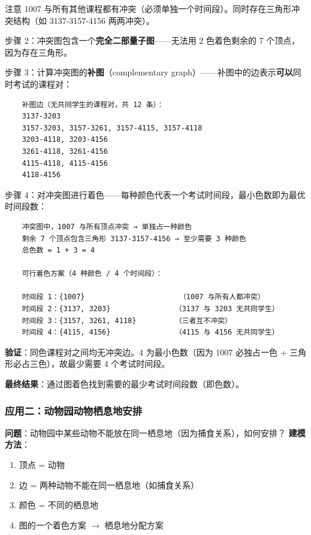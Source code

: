 \documentclass[10pt,a4paper,openany]{ctexbook}
\theoremstyle{definition}
\theoremstyle{remark}
\renewenvironment{quote}
  {\list{}{\leftmargin=1em\rightmargin=0pt\topsep=0.5pt\partopsep=0pt}\item[]}
  {\endlist}
\begin{document}
\begin{quote}
注意 1007 与所有其他课程都有冲突（必须单独一个时间段）。同时存在三角形冲突结构（如 3137-3157-4156 两两冲突）。

步骤 2：冲突图包含一个\textbf{完全二部量子图}——无法用 2 色着色剩余的 7 个顶点，因为存在三角形。

步骤 3：计算冲突图的\textbf{补图}（complementary graph）——补图中的边表示\textbf{可以}同时考试的课程对：

{\footnotesize\begin{verbatim}
    补图边（无共同学生的课程对，共 12 条）：
    3137-3203
    3157-3203, 3157-3261, 3157-4115, 3157-4118
    3203-4118, 3203-4156
    3261-4118, 3261-4156
    4115-4118, 4115-4156
    4118-4156
\end{verbatim}}


步骤 4：对冲突图进行着色——每种颜色代表一个考试时间段，最小色数即为最优时间段数：

{\footnotesize\begin{verbatim}
    冲突图中，1007 与所有顶点冲突 → 单独占一种颜色
    剩余 7 个顶点包含三角形 3137-3157-4156 → 至少需要 3 种颜色
    总色数 = 1 + 3 = 4

    可行着色方案（4 种颜色 / 4 个时间段）：
    
    时间段 1：{1007}                      （1007 与所有人都冲突）
    时间段 2：{3137, 3203}               （3137 与 3203 无共同学生）
    时间段 3：{3157, 3261, 4118}         （三者互不冲突）
    时间段 4：{4115, 4156}               （4115 与 4156 无共同学生）
\end{verbatim}}


\textbf{验证}：同色课程对之间均无冲突边。4 为最小色数（因为 1007 必独占一色 + 三角形必占三色），故最少需要 4 个考试时间段。

\textbf{最终结果}：通过图着色找到需要的最少考试时间段数（即色数）。

\end{quote}

\subsubsection{应用二：动物园动物栖息地安排}

\textbf{问题}：动物园中某些动物不能放在同一栖息地（因为捕食关系），如何安排？
\textbf{建模方法}：
\begin{enumerate}
\item 顶点 = 动物
\item 边 = 两种动物不能在同一栖息地（如捕食关系）
\item 颜色 = 不同的栖息地
\item 图的一个着色方案 $\rightarrow$ 栖息地分配方案

\end{enumerate}
\end{document}
